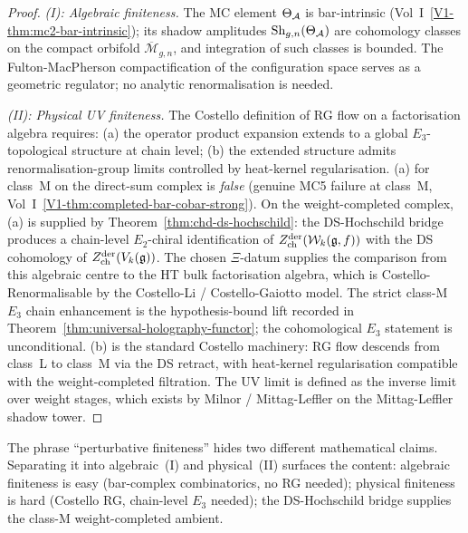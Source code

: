 \begin{proof}
\emph{(I): Algebraic finiteness.} The MC element $\Theta_{\mathcal{A}}$ is
bar-intrinsic (Vol~I~\ref*{V1-thm:mc2-bar-intrinsic}); its shadow
amplitudes $\mathrm{Sh}_{g,n}(\Theta_{\mathcal{A}})$ are cohomology classes
on the compact orbifold $\overline{\mathcal{M}}_{g,n}$, and
integration of such classes is bounded. The Fulton-MacPherson
compactification of the configuration space serves as a geometric
regulator; no analytic renormalisation is needed.

\emph{(II): Physical UV finiteness.} The Costello definition of
RG flow on a factorisation algebra requires: (a) the operator
product expansion extends to a global $E_3$-topological structure
at chain level; (b) the extended structure admits
renormalisation-group limits controlled by heat-kernel
regularisation. (a) for class~M on the direct-sum complex is
\emph{false} (genuine MC5 failure at class~M, Vol~I~\ref*{V1-thm:completed-bar-cobar-strong}).
On the weight-completed complex, (a) is supplied by
Theorem~\ref*{thm:chd-ds-hochschild}: the DS-Hochschild bridge
produces a chain-level $E_2$-chiral identification of
$Z^{\mathrm{der}}_{\mathrm{ch}}(\mathcal{W}_k(\mathfrak{g}, f))$ with the DS cohomology of
$Z^{\mathrm{der}}_{\mathrm{ch}}(V_k(\mathfrak{g}))$. The chosen \(\Xi\)-datum supplies the comparison
from this algebraic centre to the HT bulk factorisation algebra,
which is Costello-Renormalisable by the Costello-Li /
Costello-Gaiotto model. The strict class-M $E_3$ chain enhancement is
the hypothesis-bound lift recorded in
Theorem~\ref{thm:universal-holography-functor}; the cohomological
$E_3$ statement is unconditional. (b) is the standard Costello
machinery: RG flow descends from class~L to class~M via the DS retract,
with heat-kernel regularisation compatible with the weight-completed
filtration. The UV limit is defined as the inverse limit over weight
stages, which exists by Milnor / Mittag-Leffler on the
Mittag-Leffler shadow tower.
\end{proof}

\begin{remark}
\label{rem:uhf-finiteness-separation}
The phrase ``perturbative finiteness'' hides two different
mathematical claims. Separating it into algebraic~(I) and physical~(II)
surfaces the content: algebraic finiteness is easy
(bar-complex combinatorics, no RG needed); physical finiteness is
hard (Costello RG, chain-level $E_3$ needed); the DS-Hochschild
bridge supplies the class-M weight-completed ambient.
\end{remark}

